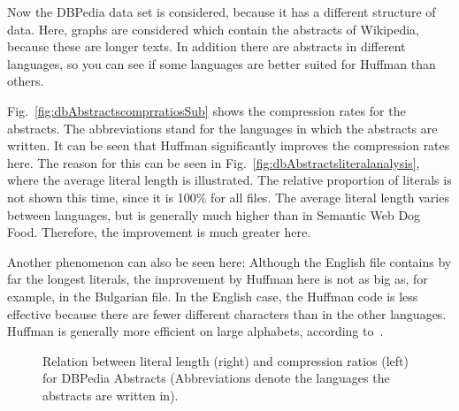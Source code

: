 Now the DBPedia data set is considered, because it has a different structure of data. Here, graphs are considered which contain the abstracts of Wikipedia, because these are longer texts. In addition there are abstracts in different languages, so you can see if some languages are better suited for Huffman than others.

Fig.~\ref{fig:dbAbstractscomprratiosSub} shows the compression rates for the abstracts. The abbreviations stand for the languages in which the abstracts are written. It can be seen that Huffman significantly improves the compression rates here. The reason for this can be seen in Fig.~\ref{fig:dbAbstractsliteralanalysis}, where the average literal length is illustrated. The relative proportion of literals is not shown this time, since it is 100\% for all files. The average literal length varies between languages, but is generally much higher than in Semantic Web Dog Food. Therefore, the improvement is much greater here.

Another phenomenon can also be seen here: Although the English file contains by far the longest literals, the improvement by Huffman here is not as big as, for example, in the Bulgarian file. In the English case, the Huffman code is less effective because there are fewer different characters than in the other languages. Huffman is generally more efficient on large alphabets, according to~\cite{huffman}.

\begin{figure}[h]
	\centering
	\hfill
	\caption{Relation between literal length (right) and compression ratios (left) for DBPedia Abstracts (Abbreviations denote the languages the abstracts are written in).}
	\label{fig:dbAbstracts}
\end{figure}

